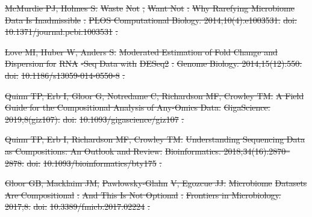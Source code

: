 \documentclass[10pt,letterpaper]{article}
\providecommand{\DIFdeltex}[1]{{\protect\color{red}\sout{#1}}}                      %
\providecommand{\DIFdel}[1]{\texorpdfstring{\DIFdeltex{#1}}{}} %
\begin{document}
\DIFdel{McMurdie PJ, Holmes S.
}%
\DIFdel{Waste }%
\DIFdel{Not}%
\DIFdel{, }%
\DIFdel{Want Not}%
\DIFdel{: }%
\DIFdel{Why Rarefying Microbiome Data Is
  Inadmissible}%
\DIFdel{.
}%
\DIFdel{PLOS Computational Biology. 2014;10(4):e1003531.
}%
\DIFdel{doi:}%
\DIFdel{10.1371/journal.pcbi.1003531}%
\DIFdel{.
}%

\DIFdel{Love MI, Huber W, Anders S.
}%
\DIFdel{Moderated Estimation of Fold Change and Dispersion for }%
\DIFdel{RNA}%
\DIFdel{-Seq
  Data with }%
\DIFdel{DESeq2}%
\DIFdel{.
}%
\DIFdel{Genome Biology. 2014;15(12):550.
}%
\DIFdel{doi:}%
\DIFdel{10.1186/s13059-014-0550-8}%
\DIFdel{.
}%

\DIFdel{Quinn TP, Erb I, Gloor G, Notredame C, Richardson MF, Crowley TM.
}%
\DIFdel{A Field Guide for the Compositional Analysis of Any-Omics Data.
}%
\DIFdel{GigaScience. 2019;8(giz107).
}%
\DIFdel{doi:}%
\DIFdel{10.1093/gigascience/giz107}%
\DIFdel{.
}%

\DIFdel{Quinn TP, Erb I, Richardson MF, Crowley TM.
}%
\DIFdel{Understanding Sequencing Data as Compositions: An Outlook and Review.
}%
\DIFdel{Bioinformatics. 2018;34(16):2870--2878.
}%
\DIFdel{doi:}%
\DIFdel{10.1093/bioinformatics/bty175}%
\DIFdel{.
}%

\DIFdel{Gloor GB, Macklaim JM, }%
\DIFdel{Pawlowsky-Glahn}%
\DIFdel{V, Egozcue JJ.
}%
\DIFdel{Microbiome }%
\DIFdel{Datasets Are Compositional}%
\DIFdel{: }%
\DIFdel{And This Is Not
  Optional}%
\DIFdel{.
}%
\DIFdel{Frontiers in Microbiology. 2017;8.
}%
\DIFdel{doi:}%
\DIFdel{10.3389/fmicb.2017.02224}%
\DIFdel{.
}%
\end{document}
